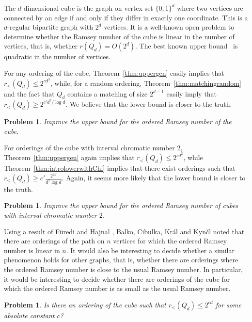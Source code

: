 \documentclass[11pt]{article}
\newtheorem{problem}[theorem]{Problem}
\newcommand{\rord}{r_{<}}
\begin{document}
The $d$-dimensional cube is the graph on vertex set $\{0, 1\}^d$ where two vertices are connected by an edge if and only if they differ in exactly one coordinate. This is a $d$-regular bipartite graph with $2^d$ vertices. It is a well-known open problem to determine whether the Ramsey number of the cube is linear in the number of vertices, that is, whether $r(Q_d) = O(2^d)$. The best known upper bound~\cite{CFS16, L15} is quadratic in the number of vertices.

For any ordering of the cube, Theorem~\ref{thm:uppergen} easily implies that $\rord(Q_d) \leq 2^{c d^3}$,
while, for a random ordering, Theorem~\ref{thm:matchingrandom} and the fact that $Q_d$ contains a matching of size $2^{d-1}$ easily imply that 
$\rord(Q_d) \geq 2^{c' d^2/\log d}$. We believe that the lower bound is closer to the truth.

\begin{problem}
Improve the upper bound for the ordered Ramsey number of the cube.
\end{problem}

For orderings of the cube with interval chromatic number $2$, Theorem~\ref{thm:uppergen} again implies that $\rord(Q_d) \leq 2^{c d^2}$,
while Theorem~\ref{thm:introlowerwithChi} implies that there exist orderings such that $\rord(Q_d) \geq c' \frac{2^{2d}}{d^2\log d}$.
Again, it seems more likely that the lower bound is closer to the truth.

\begin{problem}
Improve the upper bound for the ordered Ramsey number of cubes with interval chromatic number $2$.
\end{problem}

Using a result of F\"uredi and Hajnal \cite{FH92}, Balko, Cibulka, Kr\'al and Kyn\v cl \cite{BCKK14} noted that there are orderings of the path on $n$ vertices for which the ordered Ramsey number is linear in $n$. It would also be interesting to decide whether a similar phenomenon holds for other graphs, that is, whether there are orderings where the ordered Ramsey number is close to the usual Ramsey number. In particular, it would be interesting to decide whether there are orderings of the cube for which the ordered Ramsey number is as small as the usual Ramsey number. 

\begin{problem}
Is there an ordering of the cube such that $r_<(Q_d) \leq 2^{cd}$ for some absolute constant $c$?
\end{problem}
\end{document}
